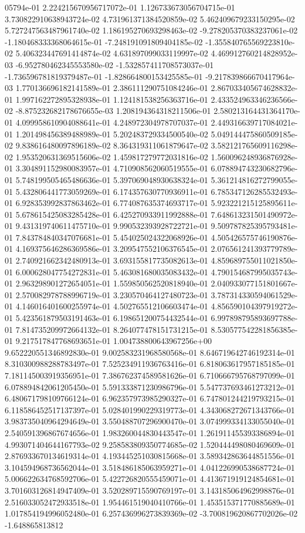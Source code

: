 05794e-01	2.224215670956717072e-01	1.126733673056704715e-01	3.730822910638943724e-02	4.731961371384520859e-02	5.462409679233150295e-02	5.727247563487961740e-02	1.186195270693298463e-02	-9.278205370383237061e-02	-1.180468333368064615e-01	-7.248191091809404185e-02	-1.355840765569223810e-02	5.406323447691414874e-02	4.631897099033119997e-02	4.469912760214828952e-03	-6.952780462345553580e-02	-1.532857411708573037e-01	-1.736596781819379487e-01	-1.828664800153425585e-01	-9.217839866670417964e-03	1.770136696182141589e-01	2.386111290751084246e-01	2.867033405674628832e-01	1.997162272895328938e-01	1.124181538256363716e-01	2.433524963346236566e-02	-8.875232682178676655e-03	1.208194364318211506e-01	2.580213164431364170e-01	4.099958610904088641e-01	4.248972304978707037e-01	2.449316639717084021e-01	1.201498456389488989e-01	5.202483729334500540e-02	5.049144475860509185e-02	9.838616480097896189e-02	8.364319311061879647e-02	3.582121765609116298e-02	1.953520631369515606e-02	1.459817279772031816e-02	1.560096248936876928e-01	3.304891152980083957e-01	4.710908562060519555e-01	6.078894743230682796e-01	5.748199505465486636e-01	5.397069048930638324e-01	5.361214816272799055e-01	5.432806441773059269e-01	6.174357630770936911e-01	6.785347126285532493e-01	6.928353992837863462e-01	6.774087635374693717e-01	5.923221215125895611e-01	5.678615425083285428e-01	6.425270933911992888e-01	7.648613231501490972e-01	9.431319740611475710e-01	9.990532393928722721e-01	9.509787825395793481e-01	7.843784840347076681e-01	5.454025024322068926e-01	4.505426575746190876e-01	4.169375646286369586e-01	3.209547552106376545e-01	2.076561241393779789e-01	2.740921662342480913e-01	3.693155817735082613e-01	4.859689755011021850e-01	6.000628047754272831e-01	5.463081680035083432e-01	4.790154687995035743e-01	2.963298901272654051e-01	1.559850562520818940e-01	2.040933077151801667e-01	2.570082978788996719e-01	3.230570464127480723e-01	3.787314330594061529e-01	4.146016401600255974e-01	4.502765512106603474e-01	4.856590104397919272e-01	5.423561879503191463e-01	6.198651200754432544e-01	6.997898795893697788e-01	7.814735209972664132e-01	8.264077478151731215e-01	8.530577542281856385e-01	9.217517847768693651e-01	1.004738800643967256e+00	9.652220551346892830e-01	9.002583231968580568e-01	8.646719642746192314e-01	8.310300988288783497e-01	7.525234911936763416e-01	6.818063617957185185e-01	7.181145003919356951e-01	7.386762374589581626e-01	6.710666795768797099e-01	6.078894842061205450e-01	5.591333871230986796e-01	5.547737693461273212e-01	6.480671798109766124e-01	6.962357973985290327e-01	6.747801244219793215e-01	6.118586452517137397e-01	5.028401990229319773e-01	4.343068272671343766e-01	3.983735040964294649e-01	3.550488707296900470e-01	3.074999334133055040e-01	2.540591396867674656e-01	1.983260044830443547e-01	1.261911455393386894e-01	4.993071404644167793e-02	9.258583809350774685e-02	1.520444498080469609e-01	2.876933670134619314e-01	4.193445251030815668e-01	3.589342863644851556e-01	3.104594968736562044e-01	3.518486185063959271e-01	4.041226990538687724e-01	5.006622634768592706e-01	5.422726820555459071e-01	4.413671919124854681e-01	3.701603126814947409e-01	3.520289715590769197e-01	3.143185064962998876e-01	2.516033052472933518e-01	1.954461519040410766e-01	1.453515371770885689e-01	1.017854194996052480e-01	6.257436996273839369e-02	-3.700819620867702026e-02	-1.648865813812